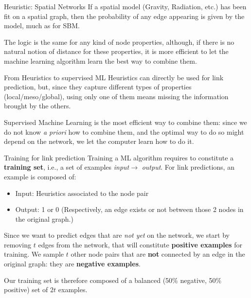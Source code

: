 \documentclass[a4paper,11pt]{book}
\begin{document}
\begin{textbox}{Heuristic: Spatial Networks}
If a spatial model (Gravity, Radiation, etc.) has been fit on a spatial graph, then the probability of any edge appearing is given by the model, much as for SBM. 

The logic is the same for any kind of node properties, although, if there is no natural notion of distance for these properties, it is more efficient to let the machine learning algorithm learn the best way to combine them.
\end{textbox}





\begin{textbox}{From Heuristics to supervised ML}
Heuristics can directly be used for link prediction, but, since they capture different types of properties (local/meso/global), using only one of them means missing the information brought by the others.

Supervised Machine Learning is the most efficient way to combine them: since we do not know \textit{a priori} how to combine them, and the optimal way to do so might depend on the network, we let the computer learn how to do it.


\end{textbox}






\begin{textbox}{Training for link prediction}
Training a ML algorithm requires to constitute a \textbf{training set}, i.e., a set of examples \textit{input}$\rightarrow$ \textit{output}. For link predictions, an example is composed of:
\begin{itemize}
    \item Input: Heuristics associated to the node pair
    \item Output: 1 or 0 (Respectively, an edge exists or not between those 2 nodes in the original graph.)
\end{itemize}

Since we want to predict edges that are \textit{not yet} on the network, we start by removing $t$ edges from the network, that will constitute \textbf{positive examples} for training. We sample $t$ other node pairs that are \textbf{not} connected by an edge in the original graph: they are \textbf{negative examples}. 

Our training set is therefore composed of a balanced (50\% negative, 50\% positive) set of $2t$ examples.  
\end{textbox}
\end{document}
